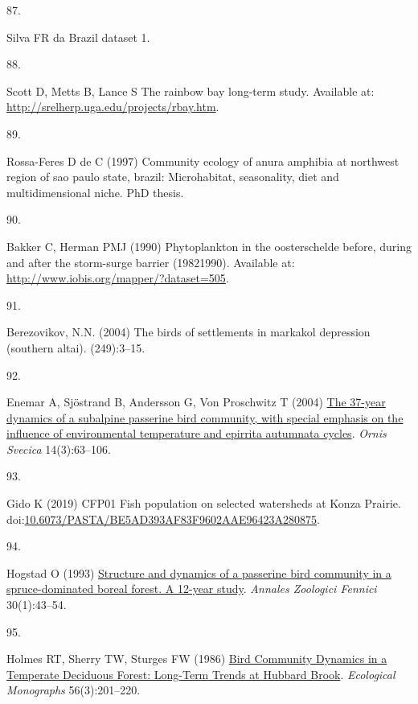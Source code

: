 \documentclass{article}
\newlength{\cslhangindent}
\newlength{\csllabelwidth}
\newlength{\cslentryspacingunit} %
\newenvironment{CSLReferences}[2] %
 {%
  \setlength{\parindent}{0pt}
  \ifodd #1
  \let\oldpar\par
  \def\par{\hangindent=\cslhangindent\oldpar}
  \fi
  \setlength{\parskip}{#2\cslentryspacingunit}
 }%
 {}
\newcommand{\CSLLeftMargin}[1]{\parbox[t]{\csllabelwidth}{#1}}
\newcommand{\CSLRightInline}[1]{\parbox[t]{\linewidth - \csllabelwidth}{#1}\break}
\begin{document}
\begin{CSLReferences}{0}{0}
\leavevmode{}%
\CSLLeftMargin{87. }%
\CSLRightInline{Silva FR da Brazil dataset 1.}

\leavevmode{}%
\CSLLeftMargin{88. }%
\CSLRightInline{Scott D, Metts B, Lance S The rainbow bay long-term
study. Available at: \url{http://srelherp.uga.edu/projects/rbay.htm}.}

\leavevmode{}%
\CSLLeftMargin{89. }%
\CSLRightInline{Rossa-Feres D de C (1997) Community ecology of anura
amphibia at northwest region of sao paulo state, brazil: Microhabitat,
seasonality, diet and multidimensional niche. PhD thesis.}

\leavevmode{}%
\CSLLeftMargin{90. }%
\CSLRightInline{Bakker C, Herman PMJ (1990) Phytoplankton in the
oosterschelde before, during and after the storm-surge barrier
(1982{\textendash}1990). Available at:
\url{http://www.iobis.org/mapper/?dataset=505}.}

\leavevmode{}%
\CSLLeftMargin{91. }%
\CSLRightInline{Berezovikov, N.N. (2004) The birds of settlements in
markakol depression (southern altai). (249):3--15.}

\leavevmode{}%
\CSLLeftMargin{92. }%
\CSLRightInline{Enemar A, Sjöstrand B, Andersson G, Von Proschwitz T
(2004) \href{https://doi.org/10.34080/os.v14.20236}{The 37-year dynamics
of a subalpine passerine bird community, with special emphasis on the
influence of environmental temperature and epirrita autumnata cycles}.
\emph{Ornis Svecica} 14(3):63--106.}

\leavevmode{}%
\CSLLeftMargin{93. }%
\CSLRightInline{Gido K (2019) CFP01 Fish population on selected
watersheds at Konza Prairie.
doi:\href{https://doi.org/10.6073/PASTA/BE5AD393AF83F9602AAE96423A280875}{10.6073/PASTA/BE5AD393AF83F9602AAE96423A280875}.}

\leavevmode{}%
\CSLLeftMargin{94. }%
\CSLRightInline{Hogstad O (1993)
\href{https://www.jstor.org/stable/23735355}{Structure and dynamics of a
passerine bird community in a spruce-dominated boreal forest. A 12-year
study}. \emph{Annales Zoologici Fennici} 30(1):43--54.}

\leavevmode{}%
\CSLLeftMargin{95. }%
\CSLRightInline{Holmes RT, Sherry TW, Sturges FW (1986)
\href{https://doi.org/10.2307/2937074}{Bird Community Dynamics in a
Temperate Deciduous Forest: Long-Term Trends at Hubbard Brook}.
\emph{Ecological Monographs} 56(3):201--220.}


\end{CSLReferences}
\end{document}
